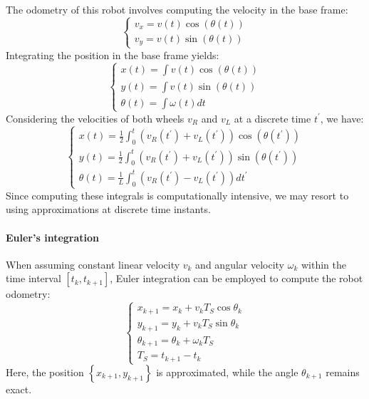 The odometry of this robot involves computing the velocity in the base frame:
\[\begin{cases}
    v_x=v(t)\cos\left(\theta(t) \right) \\ 
    v_y=v(t)\sin\left(\theta(t) \right)
\end{cases}\]
Integrating the position in the base frame yields:
\[\begin{cases}
    x(t)=\int v(t)\cos\left(\theta(t) \right) \\
    y(t)=\int v(t)\sin\left(\theta(t) \right) \\
    \theta(t)=\int \omega(t) dt
\end{cases}\]
Considering the velocities of both wheels $v_R$ and $v_L$ at a discrete time $t^\prime$, we have:
\[\begin{cases}
    x(t)=\frac{1}{2} \int_0^t \left( v_R(t^\prime) + v_L(t^\prime) \right)\cos\left(\theta(t^\prime) \right) \\
    y(t)=\frac{1}{2} \int_0^t \left( v_R(t^\prime) + v_L(t^\prime) \right)\sin\left(\theta(t^\prime) \right) \\
    \theta(t)=\frac{1}{L} \int_0^t \left( v_R(t^\prime) - v_L(t^\prime) \right) dt^\prime
\end{cases}\]
Since computing these integrals is computationally intensive, we may resort to using approximations at discrete time instants.














\paragraph*{Euler's integration}
When assuming constant linear velocity $v_k$ and angular velocity $\omega_k$ within the time interval $\left[ t_k,t_{k+1} \right]$, Euler integration can be employed to compute the robot odometry:
\[\begin{cases}
    x_{k+1} = x_k + v_kT_S\cos\theta_k \\
    y_{k+1} = y_k + v_kT_S\sin\theta_k \\
    \theta_{k+1} = \theta_k + \omega_kT_S \\
    T_S=t_{k+1}-t_k
\end{cases}\]
Here, the position $\left\{x_{k+1}, y_{k+1}\right\}$ is approximated, while the angle $\theta_{k+1}$ remains exact.


